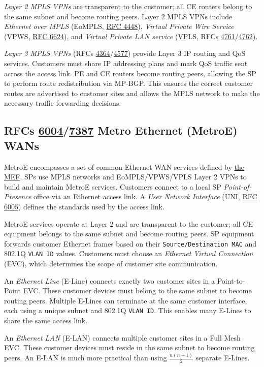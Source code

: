 \documentclass[12pt]{article}
\newcommand{\rfc}[1]{\href{https://datatracker.ietf.org/doc/html/rfc#1}{#1}}
\newcommand{\RFC}[1]{\href{https://datatracker.ietf.org/doc/html/rfc#1}{RFC #1}}
\begin{document}
	\textit{Layer 2 MPLS VPNs} are transparent to the customer; all CE routers belong to the same subnet and become routing peers. Layer 2 MPLS VPNs include \textit{Ethernet over MPLS} (EoMPLS, \RFC{4448}), \textit{Virtual Private Wire Service} (VPWS, \RFC{6624}), and \textit{Virtual Private LAN service} (VPLS, RFCs \rfc{4761}/\rfc{4762}).

	\textit{Layer 3 MPLS VPNs} (RFCs \rfc{4364}/\rfc{4577}) provide Layer 3 IP routing and QoS services. Customers must share IP addressing plans and mark QoS traffic sent across the access link. PE and CE routers become routing peers, allowing the SP to perform route redistribution via MP-BGP. This ensures the correct customer routes are advertised to customer sites and allows the MPLS network to make the necessary traffic forwarding decisions.


	\subsection[RFCs 6004/7387 MetroE WANs]{RFCs \rfc{6004}/\rfc{7387} Metro Ethernet (MetroE) WANs \label{subsec:METROE}}
	MetroE encompasses a set of common Ethernet WAN services defined by \href{www.mef.net}{the MEF}. SPs use MPLS networks and EoMPLS/VPWS/VPLS Layer 2 VPNs to build and maintain MetroE services. Customers connect to a local SP \textit{Point-of-Presence} office via an Ethernet access link. A \textit{User Network Interface} (UNI, \RFC{6005}) defines the standards used by the access link.

	MetroE services operate at Layer 2 and are transparent to the customer; all CE equipment belongs to the same subnet and become routing peers. SP equipment forwards customer Ethernet frames based on their \texttt{Source/Destination MAC} and 802.1Q \texttt{VLAN ID} values. Customers must choose an \textit{Ethernet Virtual Connection} (EVC), which determines the scope of customer site communication.
	
	An \textit{Ethernet Line} (E-Line) connects exactly two customer sites in a Point-to-Point EVC. These customer devices must belong to the same subnet to become routing peers. Multiple E-Lines can terminate at the same customer interface, each using a unique subnet and 802.1Q \texttt{VLAN ID}. This enables many E-Lines to share the same access link.

	An \textit{Ethernet LAN} (E-LAN) connects multiple customer sites in a Full Mesh EVC. These customer devices must reside in the same subnet to become routing peers. An E-LAN is much more practical than using $\frac{n(n-1)}{2}$ separate E-Lines.
\end{document}
